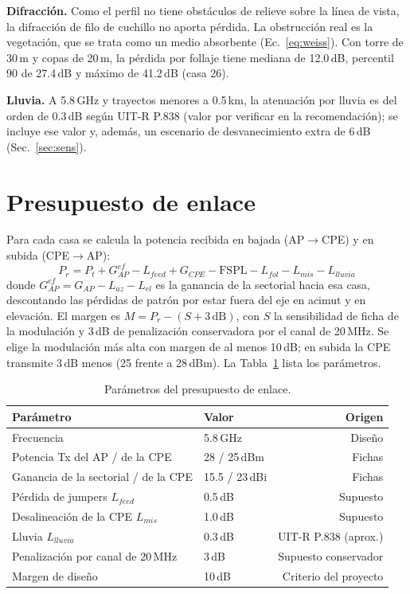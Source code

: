 \documentclass[11pt,a4paper]{article}
\begin{document}
\textbf{Difracción.} Como el perfil no tiene obstáculos de relieve sobre la línea de vista, la difracción de filo de cuchillo no aporta pérdida. La obstrucción real es la vegetación, que se trata como un medio absorbente (Ec.~\ref{eq:weiss}). Con torre de 30\,m y copas de 20\,m, la pérdida por follaje tiene mediana de 12.0\,dB, percentil 90 de 27.4\,dB y máximo de 41.2\,dB (casa 26).

\textbf{Lluvia.} A 5.8\,GHz y trayectos menores a 0.5\,km, la atenuación por lluvia es del orden de 0.3\,dB según UIT-R P.838 (valor por verificar en la recomendación); se incluye ese valor y, además, un escenario de desvanecimiento extra de 6\,dB (Sec.~\ref{sec:sens}).

\section{Presupuesto de enlace}
Para cada casa se calcula la potencia recibida en bajada (AP$\to$CPE) y en subida (CPE$\to$AP):
\begin{equation}P_r=P_t+G_{AP}^{ef}-L_{feed}+G_{CPE}-\mathrm{FSPL}-L_{fol}-L_{mis}-L_{lluvia}\end{equation}
donde $G_{AP}^{ef}=G_{AP}-L_{az}-L_{el}$ es la ganancia de la sectorial hacia esa casa, descontando las pérdidas de patrón por estar fuera del eje en acimut y en elevación. El margen es $M=P_r-(S+3\,\mathrm{dB})$, con $S$ la sensibilidad de ficha de la modulación \cite{F24} y 3\,dB de penalización conservadora por el canal de 20\,MHz. Se elige la modulación más alta con margen de al menos 10\,dB; en subida la CPE transmite 3\,dB menos (25 frente a 28\,dBm). La Tabla~\ref{tab:par} lista los parámetros.
\begin{table}[H]\centering\caption{Parámetros del presupuesto de enlace.}\label{tab:par}\small\begin{tabular}{llr}\toprule Parámetro & Valor & Origen\\\midrule Frecuencia & 5.8\,GHz & Diseño\\ Potencia Tx del AP / de la CPE & 28 / 25\,dBm & Fichas \cite{F24,F27}\\ Ganancia de la sectorial / de la CPE & 15.5 / 23\,dBi & Fichas \cite{F25,F27}\\ Pérdida de jumpers $L_{feed}$ & 0.5\,dB & Supuesto\\ Desalineación de la CPE $L_{mis}$ & 1.0\,dB & Supuesto\\ Lluvia $L_{lluvia}$ & 0.3\,dB & UIT-R P.838 (aprox.)\\ Penalización por canal de 20\,MHz & 3\,dB & Supuesto conservador\\ Margen de diseño & 10\,dB & Criterio del proyecto\\\bottomrule\end{tabular}\end{table}
\end{document}
